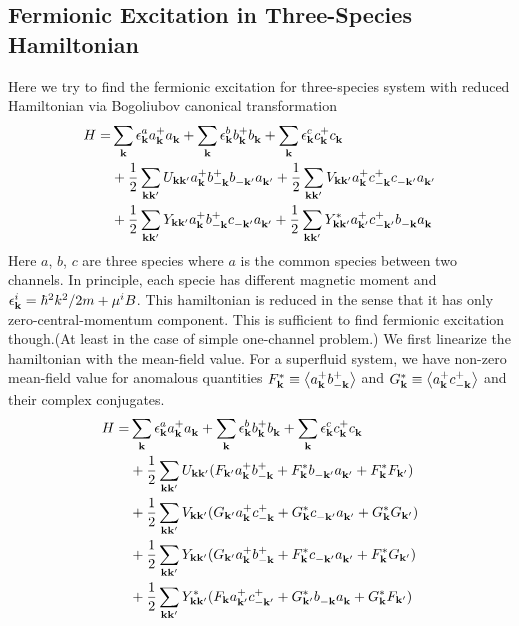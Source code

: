 \subsection{Fermionic Excitation in Three-Species Hamiltonian\label{sec:fermionicExcitation}}
Here we try to find the fermionic excitation for three-species system with reduced Hamiltonian via Bogoliubov canonical transformation\cite{Tinkham}
\begin{equation}\label{eq:threeReducedHamiltonian}
\begin{split}
 H=&\sum_{\mathbf{k}}\epsilon^a_{\mathbf{k}}{}a^+_{\mathbf{k}}{}a^{}_{\mathbf{k}}+\sum_{\mathbf{k}}\epsilon^b_{\mathbf{k}}{}b^+_{\mathbf{k}}{}b^{}_{\mathbf{k}}+\sum_{\mathbf{k}}\epsilon^c_{\mathbf{k}}{}c^+_{\mathbf{k}}{}c^{}_{\mathbf{k}}\\
  &+\frac{1}{2}\sum_{\mathbf{k}\mathbf{k}'}U_{\mathbf{k}\mathbf{k}'}a^+_{\mathbf{k}}{}b^+_{-\mathbf{k}}{}b^{}_{-\mathbf{k}'}a^{}_{\mathbf{k}'}
	+\frac{1}{2}\sum_{\mathbf{k}\mathbf{k}'}V_{\mathbf{k}\mathbf{k}'}a^+_{\mathbf{k}}{}c^+_{-\mathbf{k}}{}c^{}_{-\mathbf{k}'}a^{}_{\mathbf{k}'}\\
 &+\frac{1}{2}\sum_{\mathbf{k}\mathbf{k}'}Y_{\mathbf{k}\mathbf{k}'}a^+_{\mathbf{k}}{}b^+_{-\mathbf{k}}{}c^{}_{-\mathbf{k}'}a^{}_{\mathbf{k}'}
	+\frac{1}{2}\sum_{\mathbf{k}\mathbf{k}'}Y^*_{\mathbf{k}\mathbf{k}'}a^+_{\mathbf{k}'}{}c^+_{-\mathbf{k}'}{}b^{}_{-\mathbf{k}}a^{}_{\mathbf{k}}
\end{split} 
\end{equation}
Here $a$, $b$, $c$ are three species where $a$ is the common species between two channels. In principle, each specie has different magnetic moment and $\epsilon^{i}_{\mathbf{k}}=\hbar^{2}k^{2}/2m+\mu^{i}B$. This hamiltonian is reduced in the sense that it has only zero-central-momentum component.  This is sufficient to find fermionic excitation though.(At least in the case of simple one-channel problem.)  We first linearize the hamiltonian with the mean-field value. For a superfluid system, we have non-zero mean-field value for anomalous quantities $F^{*}_{\mathbf{k}}\equiv\bigl<{a^+_{\mathbf{k}}{}b^+_{-\mathbf{k}}{}}\bigr>$ and $G^{*}_{\mathbf{k}}\equiv\bigl<{a^+_{\mathbf{k}}{}c^+_{-\mathbf{k}}{}}\bigr>$ and their complex conjugates. 
\begin{equation}
\begin{split}
 H=&\sum_{\mathbf{k}}\epsilon^a_{\mathbf{k}}{}a^+_{\mathbf{k}}{}a^{}_{\mathbf{k}}+\sum_{\mathbf{k}}\epsilon^b_{\mathbf{k}}{}b^+_{\mathbf{k}}{}b^{}_{\mathbf{k}}+\sum_{\mathbf{k}}\epsilon^c_{\mathbf{k}}{}c^+_{\mathbf{k}}{}c^{}_{\mathbf{k}}\\
  &+\frac{1}{2}\sum_{\mathbf{k}\mathbf{k}'}U_{\mathbf{k}\mathbf{k}'}(F_{\mathbf{k}'}a^+_{\mathbf{k}}{}b^+_{-\mathbf{k}}{}+F^{*}_{\mathbf{k}}{}b^{}_{-\mathbf{k}'}a^{}_{\mathbf{k}'}+F_{\mathbf{k}}^{*}F_{\mathbf{k}'})\\
	&+\frac{1}{2}\sum_{\mathbf{k}\mathbf{k}'}V_{\mathbf{k}\mathbf{k}'}(G_{\mathbf{k}'}a^+_{\mathbf{k}}{}c^+_{-\mathbf{k}}{}+G^{*}_{\mathbf{k}}c^{}_{-\mathbf{k}'}a^{}_{\mathbf{k}'}+G_{\mathbf{k}}^{*}G_{\mathbf{k}'})\\
 &+\frac{1}{2}\sum_{\mathbf{k}\mathbf{k}'}Y_{\mathbf{k}\mathbf{k}'}(G_{\mathbf{k}'}a^+_{\mathbf{k}}{}b^+_{-\mathbf{k}}{}+F^{*}_{\mathbf{k}}c^{}_{-\mathbf{k}'}a^{}_{\mathbf{k}'}+F_{\mathbf{k}}^{*}G_{\mathbf{k}'})\\
	&+\frac{1}{2}\sum_{\mathbf{k}\mathbf{k}'}Y^*_{\mathbf{k}\mathbf{k}'}(F_{\mathbf{k}}a^+_{\mathbf{k}'}{}c^+_{-\mathbf{k}'}{}+G^{*}_{\mathbf{k}'}b^{}_{-\mathbf{k}}a^{}_{\mathbf{k}}+G_{\mathbf{k}}^{*}F_{\mathbf{k}'})
\end{split} 
\end{equation}
